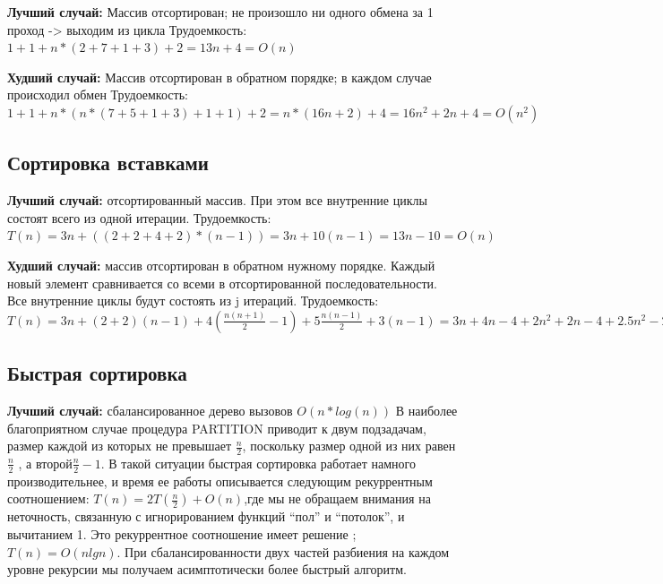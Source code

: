 \documentclass[12pt]{report}
\begin{document}
 
\textbf{Лучший случай:} Массив отсортирован; не произошло ни одного обмена за 1 проход -> выходим из цикла \newline
Трудоемкость:  $1 + 1 + n* (2 + 7 + 1 + 3 ) + 2 = 13n + 4 = O(n)$

\textbf{Худший случай:}  Массив отсортирован в обратном порядке; в каждом случае происходил обмен\newline
Трудоемкость: $1 + 1 +  n*(n* (7 + 5 + 1  + 3)  + 1 + 1) + 2 =  n*(16n + 2) + 4 = 16n^2 + 2n + 4 = O(n^2)$


\subsection{Сортировка вставками}
\hspace*{5mm}
\textbf{Лучший случай:} отсортированный массив. При этом все внутренние циклы состоят всего из одной итерации.\newline
Трудоемкость: $T(n) = 3n + ((2 + 2 + 4 + 2 ) * (n - 1))  =  3n + 10(n-1) = 13n - 10 = O(n)$

\textbf{Худший случай:} массив отсортирован в обратном нужному порядке. Каждый новый элемент сравнивается со всеми в отсортированной последовательности.
Все внутренние циклы будут состоять из j итераций. \newline
Трудоемкость: $T(n) = 3n + (2 + 2)(n-1) + 4 \left({\frac {n(n+1)}{2}}-1\right)+5{\frac {n(n-1)}{2}}+3(n-1) = 3n + 4n - 4 + 2n^2
+ 2n - 4 + 2.5n^2 - 2.5n + 3n - 3 = 4.5n^2 + 9.5n - 11 = O(n^{2})$

\subsection{Быстрая сортировка}
\hspace*{5mm}
\textbf{Лучший случай:} сбалансированное дерево вызовов \(O(n*log(n))\)  
В наиболее благоприятном случае процедура PARTITION приводит к двум подзадачам, размер каждой из которых не превышает $\frac{n}{2}$, поскольку размер одной из них равен $\frac{n}{2}$ , а второй$\frac{n}{2} - 1$. В такой ситуации быстрая сортировка работает намного производительнее, и время ее работы описывается следующим рекуррентным соотношением: $T(n) = 2T(\frac{n}{2}) + O(n)$,где мы не обращаем внимания на неточность, связанную с игнорированием функций “пол” и “потолок”, и вычитанием 1. Это рекуррентное соотношение имеет решение ; $T(n) =O(nlgn)$. При сбалансированности двух частей разбиения на каждом уровне рекурсии мы получаем асимптотически более быстрый алгоритм.
\end{document}
